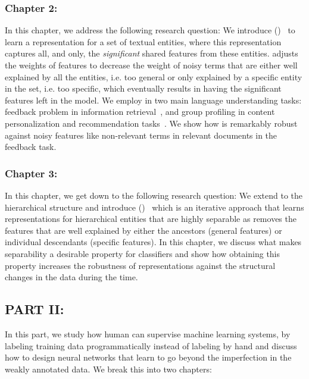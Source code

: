 \subsubsection*{Chapter 2: }
In this chapter, we address the following research question:
We introduce \emph{\swlm} (\acswlm)~\citep{Dehghani:2016:SIGIR} to learn a representation for a set of textual entities, where this representation captures all, and only, the \textit{significant} shared features from these entities.  \acswlm adjusts the weights of features to decrease the weight of noisy terms that are either well explained by all the entities, i.e. too general or only explained by a specific entity in the set, i.e. too specific, which eventually results in having the significant features left in the model.  
We employ \acswlm in two main language understanding tasks: feedback problem in information retrieval~\citep{Dehghani:CIKM2016:long, Dehghani:CIKM2016:short}, and group profiling in content personalization and recommendation tasks~\citep{Dehghani:2016:CHIIR,Dehghani2016:trec}. We show how \acswlm is remarkably robust against noisy features like non-relevant terms in relevant documents in the feedback task. 

\subsubsection*{Chapter 3: }
In this chapter, we get down to the following research question:
We extend \emph{\swlms} to the hierarchical structure and introduce \emph{\hswlms} (\achswlm)~\citep{Dehghani:2016:ICTIR, Dehghani:2016:CLEF} which is an iterative approach that learns representations for hierarchical entities that are highly separable as \acswlm removes the features that are well explained by either the ancestors (general features) or individual descendants (specific features). In this chapter, we discuss what makes separability a desirable property for classifiers and show how obtaining this property increases the robustness of representations against the structural changes in the data during the time.

\subsection*{PART II: }
In this part, we study how human can supervise machine learning systems, by labeling training data programmatically instead of labeling by hand and discuss how to design neural networks that learn to go beyond the imperfection in the weakly annotated data. We break this into two chapters:

